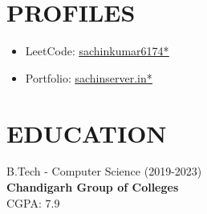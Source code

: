 \documentclass[11pt,a4paper]{moderncv}
\let\oldhref\href
\renewcommand{\href}[2]{\oldhref{#1}{\underline{#2}}}
\begin{document}
\begin{minipage}[t]{0.35\textwidth}
\section{PROFILES}
\begin{itemize}
    \item LeetCode: \href{https://leetcode.com/u/sachinkumar6174/}{sachinkumar6174*}
    \item Portfolio: \href{https://sachinserver.in/}{sachinserver.in*}
\end{itemize}

\section{EDUCATION}
B.Tech - Computer Science (2019-2023) \\
\textbf{Chandigarh Group of Colleges} \\
\faCalendar\enspace CGPA: 7.9
\end{minipage}
\end{document}
